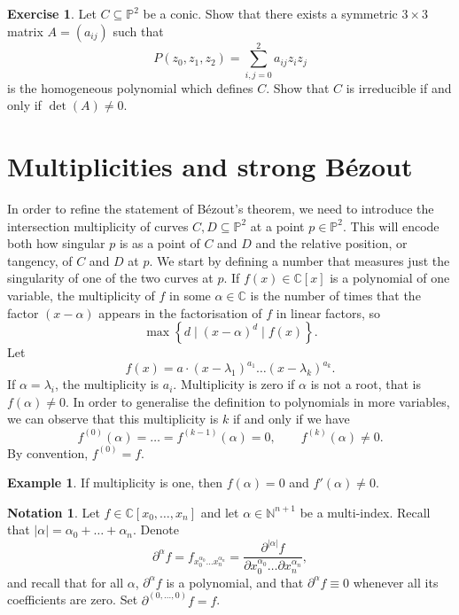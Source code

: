 \documentclass{article}
\newcommand{\N}{\mathbb{N}}
\newcommand{\C}{\mathbb{C}}
\renewcommand{\P}{\mathbb{P}}
\newcommand{\rb}[1]{\left( #1 \right)}
\renewcommand{\sb}[1]{\left[ #1 \right]}
\newcommand{\cb}[1]{\left\{ #1 \right\}}
\newcommand{\abs}[1]{\left\lvert #1 \right\rvert}
\theoremstyle{definition}\newtheorem{definition}{Definition}[section]
\theoremstyle{definition}\newtheorem{notation}[definition]{Notation}
\theoremstyle{definition}\newtheorem{remark}[definition]{Remark}
\theoremstyle{definition}\newtheorem{example1}[definition]{Example}
\theoremstyle{definition}\newtheorem{fact}{Fact}
\theoremstyle{definition}\newtheorem{exercise}{Exercise}
\theoremstyle{definition}\newtheorem*{example2}{Example}
\begin{document}
\begin{exercise}
\label{ex:31}
Let $ C \subseteq \P^2 $ be a conic. Show that there exists a symmetric $ 3 \times 3 $ matrix $ A = \rb{a_{ij}} $ such that
$$ P\rb{z_0, z_1, z_2} = \sum_{i, j = 0}^2 a_{ij}z_iz_j $$
is the homogeneous polynomial which defines $ C $. Show that $ C $ is irreducible if and only if $ \det\rb{A} \ne 0 $.
\end{exercise}

\pagebreak

\section{Multiplicities and strong B\'ezout}

In order to refine the statement of B\'ezout's theorem, we need to introduce the intersection multiplicity of curves $ C, D \subseteq \P^2 $ at a point $ p \in \P^2 $. This will encode both how singular $ p $ is as a point of $ C $ and $ D $ and the relative position, or tangency, of $ C $ and $ D $ at $ p $. We start by defining a number that measures just the singularity of one of the two curves at $ p $. If $ f\rb{x} \in \C\sb{x} $ is a polynomial of one variable, the multiplicity of $ f $ in some $ \alpha \in \C $ is the number of times that the factor $ \rb{x - \alpha} $ appears in the factorisation of $ f $ in linear factors, so
$$ \max\cb{d \mid \rb{x - \alpha}^d \mid f\rb{x}}. $$
Let
$$ f\rb{x} = a \cdot \rb{x - \lambda_1}^{a_1} \dots \rb{x - \lambda_k}^{a_k}. $$
If $ \alpha = \lambda_i $, the multiplicity is $ a_i $. Multiplicity is zero if $ \alpha $ is not a root, that is $ f\rb{\alpha} \ne 0 $. In order to generalise the definition to polynomials in more variables, we can observe that this multiplicity is $ k $ if and only if we have
$$ f^{\rb{0}}\rb{\alpha} = \dots = f^{\rb{k - 1}}\rb{\alpha} = 0, \qquad f^{\rb{k}}\rb{\alpha} \ne 0. $$
By convention, $ f^{\rb{0}} = f $.

\begin{example2}
If multiplicity is one, then $ f\rb{\alpha} = 0 $ and $ f'\rb{\alpha} \ne 0 $.
\end{example2}

\begin{notation}
Let $ f \in \C\sb{x_0, \dots, x_n} $ and let $ \alpha \in \N^{n + 1} $ be a multi-index. Recall that $ \abs{\alpha} = \alpha_0 + \dots + \alpha_n $. Denote
$$ \partial^\alpha f = f_{x_0^{\alpha_0} \dots x_n^{\alpha_n}} = \dfrac{\partial^{\abs{\alpha}} f}{\partial x_0^{\alpha_0} \dots \partial x_n^{\alpha_n}}, $$
and recall that for all $ \alpha $, $ \partial^\alpha f $ is a polynomial, and that $ \partial^\alpha f \equiv 0 $ whenever all its coefficients are zero. Set $ \partial^{\rb{0, \dots, 0}} f = f $.
\end{notation}
\end{document}

